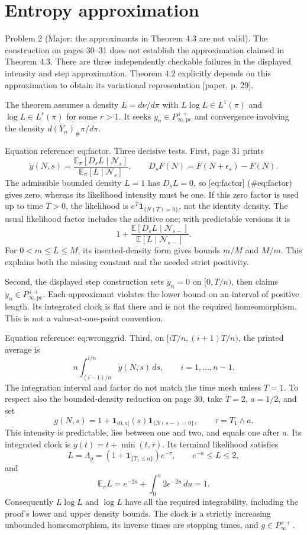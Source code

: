 \documentclass[10pt]{article}
\begin{document}
\section*{Entropy approximation}
Problem 2 (Major: the approximants in Theorem 4.3 are not valid).  The construction on pages 30–31 does not establish the approximation claimed in Theorem 4.3. There are three independently checkable failures in the displayed intensity and step approximation. Theorem 4.2 explicitly depends on this approximation to obtain its variational representation [paper, p. 29].\par
The theorem assumes a density \(L=d\nu/d\pi\) with \(L\log L\in L^1(\pi)\) and \(\log L\in L^r(\pi)\) for some \(r>1\). It seeks \(\dot y_n\in P_{\infty,\mathrm{pc}}^{++}\) and convergence involving the density \(d(Y_n)_\#\pi/d\pi\).\par
Equation reference: eq:factor. Three decisive tests. First, page 31 prints \[
\dot y(N,s)=\frac{\mathbb E_\pi[D_sL\mid\mathcal N_s]}{\mathbb E_\pi[L\mid\mathcal N_s]},
\qquad D_sF(N)=F(N+\epsilon_s)-F(N).\] The admissible bounded density \(L=1\) has \(D_sL=0\), so [eq:factor] (\#eq:factor) gives zero, whereas its likelihood intensity must be one. If this zero factor is used up to time \(T>0\), the likelihood is \(e^T\mathbf1_{\{N(T)=0\}}\), not the identity density. The usual likelihood factor includes the additive one; with predictable versions it is \[1+\frac{\mathbb E[D_sL\mid\mathcal N_{s-}]}{\mathbb E[L\mid\mathcal N_{s-}]}.\] For \(0<m\leq L\leq M\), its inserted-density form gives bounds \(m/M\) and \(M/m\). This explains both the missing constant and the needed strict positivity.\par
Second, the displayed step construction sets \(\dot y_n=0\) on \([0,T/n)\), then claims \(\dot y_n\in P_{\infty,\mathrm{pc}}^{++}\). Each approximant violates the lower bound on an interval of positive length. Its integrated clock is flat there and is not the required homeomorphism. This is not a value-at-one-point convention.\par
Equation reference: eq:wronggrid. Third, on \([iT/n,(i+1)T/n)\), the printed average is \[
n\int_{(i-1)/n}^{i/n}\dot y(N,s)\,ds,\qquad i=1,\ldots,n-1.\] The integration interval and factor do not match the time mesh unless \(T=1\). To respect also the bounded-density reduction on page 30, take \(T=2\), \(a=1/2\), and set \[g(N,s)=1+\mathbf1_{(0,a]}(s)\mathbf1_{\{N(s-)=0\}},
\qquad \tau=T_1\wedge a.\] This intensity is predictable, lies between one and two, and equals one after \(a\). Its integrated clock is \(y(t)=t+\min(t,\tau)\). Its terminal likelihood satisfies \[L=\Lambda_g=(1+\mathbf1_{\{T_1\leq a\}})e^{-\tau},
\qquad e^{-a}\leq L\leq2,\] and \[\mathbb E_\pi L=e^{-2a}+\int_0^a2e^{-2u}\,du=1.\] Consequently \(L\log L\) and \(\log L\) have all the required integrability, including the proof’s lower and upper density bounds. The clock is a strictly increasing unbounded homeomorphism, its inverse times are stopping times, and \(g\in P_\infty^{++}\).\par
\end{document}

